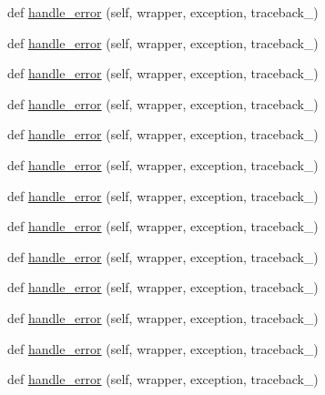\begin{DoxyCompactItemize}
\item 
def \hyperlink{classmodulegen____gcc__LP64_1_1ErrorHandler_ae861af2ccf0c7d1732eb52c22d89f8fd}{handle\+\_\+error} (self, wrapper, exception, traceback\+\_\+)
\item 
def \hyperlink{classmodulegen____gcc__LP64_1_1ErrorHandler_ae861af2ccf0c7d1732eb52c22d89f8fd}{handle\+\_\+error} (self, wrapper, exception, traceback\+\_\+)
\item 
def \hyperlink{classmodulegen____gcc__LP64_1_1ErrorHandler_ae861af2ccf0c7d1732eb52c22d89f8fd}{handle\+\_\+error} (self, wrapper, exception, traceback\+\_\+)
\item 
def \hyperlink{classmodulegen____gcc__LP64_1_1ErrorHandler_ae861af2ccf0c7d1732eb52c22d89f8fd}{handle\+\_\+error} (self, wrapper, exception, traceback\+\_\+)
\item 
def \hyperlink{classmodulegen____gcc__LP64_1_1ErrorHandler_ae861af2ccf0c7d1732eb52c22d89f8fd}{handle\+\_\+error} (self, wrapper, exception, traceback\+\_\+)
\item 
def \hyperlink{classmodulegen____gcc__LP64_1_1ErrorHandler_ae861af2ccf0c7d1732eb52c22d89f8fd}{handle\+\_\+error} (self, wrapper, exception, traceback\+\_\+)
\item 
def \hyperlink{classmodulegen____gcc__LP64_1_1ErrorHandler_ae861af2ccf0c7d1732eb52c22d89f8fd}{handle\+\_\+error} (self, wrapper, exception, traceback\+\_\+)
\item 
def \hyperlink{classmodulegen____gcc__LP64_1_1ErrorHandler_ae861af2ccf0c7d1732eb52c22d89f8fd}{handle\+\_\+error} (self, wrapper, exception, traceback\+\_\+)
\item 
def \hyperlink{classmodulegen____gcc__LP64_1_1ErrorHandler_ae861af2ccf0c7d1732eb52c22d89f8fd}{handle\+\_\+error} (self, wrapper, exception, traceback\+\_\+)
\item 
def \hyperlink{classmodulegen____gcc__LP64_1_1ErrorHandler_ae861af2ccf0c7d1732eb52c22d89f8fd}{handle\+\_\+error} (self, wrapper, exception, traceback\+\_\+)
\item 
def \hyperlink{classmodulegen____gcc__LP64_1_1ErrorHandler_ae861af2ccf0c7d1732eb52c22d89f8fd}{handle\+\_\+error} (self, wrapper, exception, traceback\+\_\+)
\item 
def \hyperlink{classmodulegen____gcc__LP64_1_1ErrorHandler_ae861af2ccf0c7d1732eb52c22d89f8fd}{handle\+\_\+error} (self, wrapper, exception, traceback\+\_\+)
\item 
def \hyperlink{classmodulegen____gcc__LP64_1_1ErrorHandler_ae861af2ccf0c7d1732eb52c22d89f8fd}{handle\+\_\+error} (self, wrapper, exception, traceback\+\_\+)

\end{DoxyCompactItemize}
